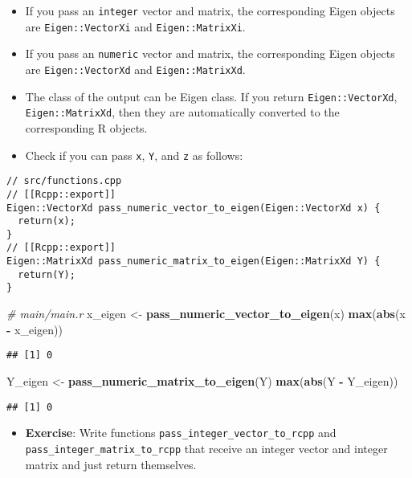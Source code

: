 \documentclass[
]{book}
\newenvironment{Shaded}{\begin{snugshade}}{\end{snugshade}}
\newcommand{\CommentTok}[1]{\textcolor[rgb]{0.56,0.35,0.01}{\textit{#1}}}
\newcommand{\FunctionTok}[1]{\textcolor[rgb]{0.13,0.29,0.53}{\textbf{#1}}}
\newcommand{\NormalTok}[1]{#1}
\newcommand{\OtherTok}[1]{\textcolor[rgb]{0.56,0.35,0.01}{#1}}
\newcommand{\SpecialCharTok}[1]{\textcolor[rgb]{0.81,0.36,0.00}{\textbf{#1}}}
\providecommand{\tightlist}{%
  \setlength{\itemsep}{0pt}\setlength{\parskip}{0pt}}
\begin{document}
\begin{itemize}
\tightlist
\item
  If you pass an \texttt{integer} vector and matrix, the corresponding Eigen objects are \texttt{Eigen::VectorXi} and \texttt{Eigen::MatrixXi}.
\item
  If you pass an \texttt{numeric} vector and matrix, the corresponding Eigen objects are \texttt{Eigen::VectorXd} and \texttt{Eigen::MatrixXd}.
\item
  The class of the output can be Eigen class. If you return \texttt{Eigen::VectorXd}, \texttt{Eigen::MatrixXd}, then they are automatically converted to the corresponding R objects.
\item
  Check if you can pass \texttt{x}, \texttt{Y}, and \texttt{z} as follows:
\end{itemize}

\begin{verbatim}
// src/functions.cpp
// [[Rcpp::export]]
Eigen::VectorXd pass_numeric_vector_to_eigen(Eigen::VectorXd x) {
  return(x);
}
// [[Rcpp::export]]
Eigen::MatrixXd pass_numeric_matrix_to_eigen(Eigen::MatrixXd Y) {
  return(Y);
}
\end{verbatim}

\begin{Shaded}
\begin{Highlighting}[]
\CommentTok{\# main/main.r}
\NormalTok{x\_eigen }\OtherTok{\textless{}{-}} \FunctionTok{pass\_numeric\_vector\_to\_eigen}\NormalTok{(x)}
\FunctionTok{max}\NormalTok{(}\FunctionTok{abs}\NormalTok{(x }\SpecialCharTok{{-}}\NormalTok{ x\_eigen))}
\end{Highlighting}
\end{Shaded}

\begin{verbatim}
## [1] 0
\end{verbatim}

\begin{Shaded}
\begin{Highlighting}[]
\NormalTok{Y\_eigen }\OtherTok{\textless{}{-}} \FunctionTok{pass\_numeric\_matrix\_to\_eigen}\NormalTok{(Y)}
\FunctionTok{max}\NormalTok{(}\FunctionTok{abs}\NormalTok{(Y }\SpecialCharTok{{-}}\NormalTok{ Y\_eigen))}
\end{Highlighting}
\end{Shaded}

\begin{verbatim}
## [1] 0
\end{verbatim}

\begin{itemize}
\tightlist
\item
  \textbf{Exercise}: Write functions \texttt{pass\_integer\_vector\_to\_rcpp} and \texttt{pass\_integer\_matrix\_to\_rcpp} that receive an integer vector and integer matrix and just return themselves.
\end{itemize}
\end{document}
